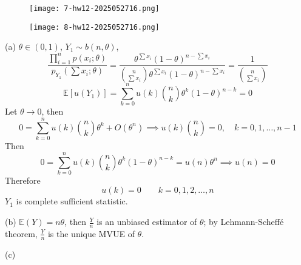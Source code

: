 \begin{exercise}
\begin{figure}[H]
\centering
\texttt{[image: 7-hw12-2025052716.png]}
\label{}
\end{figure}
\begin{figure}[H]
\centering
\texttt{[image: 8-hw12-2025052716.png]}
\label{}
\end{figure}
\end{exercise}
(a) $\theta\in(0,1)$, $Y_1\sim b(n,\theta)$,
\[
\frac{\prod_{i=1}^{n} p(x_i;\theta)}{p_{Y_1}\left( \sum x_i;\theta \right)}=\frac{\theta^{\sum x_i}(1-\theta)^{n-\sum x_i}}{\binom{n}{\sum x_i} \theta^{\sum x_i}(1-\theta)^{n-\sum x_i}}=\frac{1}{\binom{n}{\sum x_i} }
\]
\[
\mathbb{E}[u(Y_1)]=\sum_{k=0}^{n}u(k)\binom{n}{k} \theta^{k}(1-\theta)^{n-k}=0
\]
Let $\theta\to0$, then
\[
0=\sum_{k=0}^{n}u(k)\binom{n}{k} \theta^{k}+O(\theta^{n})\implies u(k)\binom{n}{k} =0,\quad k=0,1,\dots,n-1
\]
Then
\[
0=\sum_{k=0}^{n}u(k)\binom{n}{k} \theta^{k}(1-\theta)^{n-k}=u(n) \theta^{n}\implies u(n)=0
\]
Therefore
\[
u(k)=0\qquad k=0,1,2,\dots,n
\]
$Y_1$ is complete sufficient statistic.

(b)
$\mathbb{E}(Y)=n\theta$, then $\frac{Y}{n}$ is an unbiased estimator of $\theta$; by Lehmann-Scheffé theorem, $\frac{Y}{n}$ is the unique MVUE of $\theta$.

(c)

